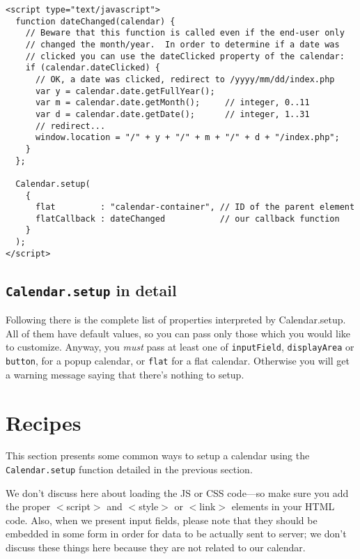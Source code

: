 \documentclass[a4paper,twoside,10pt]{dynadoc}
\begin{document}
\begin{verbatim}
<script type="text/javascript">
  function dateChanged(calendar) {
    // Beware that this function is called even if the end-user only
    // changed the month/year.  In order to determine if a date was
    // clicked you can use the dateClicked property of the calendar:
    if (calendar.dateClicked) {
      // OK, a date was clicked, redirect to /yyyy/mm/dd/index.php
      var y = calendar.date.getFullYear();
      var m = calendar.date.getMonth();     // integer, 0..11
      var d = calendar.date.getDate();      // integer, 1..31
      // redirect...
      window.location = "/" + y + "/" + m + "/" + d + "/index.php";
    }
  };

  Calendar.setup(
    {
      flat         : "calendar-container", // ID of the parent element
      flatCallback : dateChanged           // our callback function
    }
  );
</script>
\end{verbatim}

\subsection{\texttt{Calendar.setup} in detail}\label{sec:Calendar.setup}

Following there is the complete list of properties interpreted by
Calendar.setup.  All of them have default values, so you can pass only those
which you would like to customize.  Anyway, you \emph{must} pass at least one
of \texttt{inputField}, \texttt{displayArea} or \texttt{button}, for a popup
calendar, or \texttt{flat} for a flat calendar.  Otherwise you will get a
warning message saying that there's nothing to setup.

\begin{small}
\ifx\shipout\undefined

\else
{}
\fi
\end{small}




\section{Recipes}

This section presents some common ways to setup a calendar using the
\texttt{Calendar.setup} function detailed in the previous section.

We don't discuss here about loading the JS or CSS code---so make sure you
add the proper $<$script$>$ and $<$style$>$ or $<$link$>$ elements in your
HTML code.  Also, when we present input fields, please note that they should
be embedded in some form in order for data to be actually sent to server; we
don't discuss these things here because they are not related to our
calendar.
\end{document}
